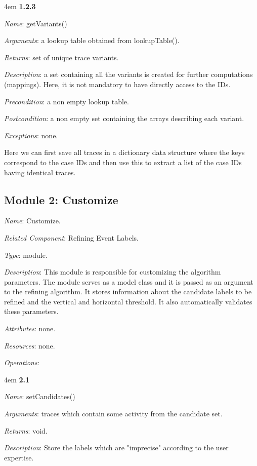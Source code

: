 \documentclass[notitlepage]{article}
\begin{document}
\begin{flushleft}
\par
\begingroup
\leftskip4em
\textbf{1.2.3}

\textit{Name}: getVariants()

\textit{Arguments}: a lookup table obtained from lookupTable().

\textit{Returns}: set of unique trace variants.

\textit{Description}: a set containing all the variants is created for further computations (mappings). Here, it is not mandatory to have directly access to the IDs.

\textit{Precondition}: a non empty lookup table.

\textit{Postcondition}: a non empty set containing the arrays describing each variant.

\textit{Exceptions}: none.

\par
\endgroup

Here we can first save all traces in a dictionary data structure where the keys correspond to the case IDs and then use this to extract a list of the case IDs having identical traces.


\subsection{Module 2: Customize}
\textit{Name}: Customize.

\textit{Related Component}: Refining Event Labels.

\textit{Type}: module.

\textit{Description}: This module is responsible for customizing the algorithm parameters. The module serves as a model class and it is passed as an argument to the refining algorithm.
It stores information about the candidate labels to be refined and the vertical and horizontal threshold. It also automatically validates these parameters.  

\textit{Attributes}: none.

\textit{Resources}: none.

\textit{Operations}: 
\medskip


\par
\begingroup
\leftskip4em
\textbf{2.1} 

\textit{Name}: setCandidates()

\textit{Arguments}: traces which contain some activity from the candidate set.

\textit{Returns}: void.

\textit{Description}: Store the labels which are "imprecise" according to the user expertise. 


\end{flushleft}
\end{document}
